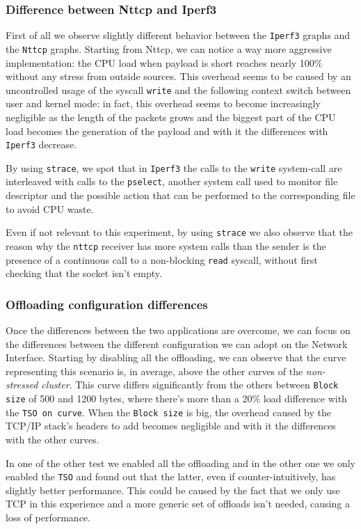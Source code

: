 \documentclass{exam}
\begin{document}
\subsubsection{Difference between Nttcp and Iperf3}
First of all we observe slightly different behavior between the \verb|Iperf3| graphs and the \verb|Nttcp| graphs. 
Starting from Nttcp, we can notice a way more aggressive implementation: the CPU load when payload is short reaches nearly 100\% without any stress from outside sources. This overhead seems to be caused by an uncontrolled usage of the syscall \verb|write| and the following context switch between user and kernel mode: in fact, this overhead seems to become increasingly negligible as the length of the packets grows and the biggest part of the CPU load becomes the generation of the payload and with it the differences with \verb|Iperf3| decrease.

By using \verb|strace|, we spot that in \verb|Iperf3| the calls to the \verb|write| system-call are interleaved with calls to the \verb|pselect|, another system call used to monitor file descriptor and the possible action that can be performed to the corresponding file to avoid CPU waste. 

Even if not relevant to this experiment, by using \verb|strace| we also observe that the reason why the \verb|nttcp| receiver has more system calls than the sender is the presence of a continuous call to a non-blocking \verb|read| syscall, without first checking that the socket isn't empty.

\subsubsection{Offloading configuration differences}
Once the differences between the two applications are overcome, we can focus on the differences between the different configuration we can adopt on the Network Interface.
Starting by disabling all the offloading, we can observe that the curve representing this scenario is, in average, above the other curves of the \textit{non-stressed cluster}. This curve differs significantly from the others between \verb|Block size| of 500 and 1200 bytes, where there's more than a 20\% load difference with the \verb|TSO on curve|. When the \verb|Block size| is big, the overhead caused by the TCP/IP stack's headers to add becomes negligible and with it the differences with the other curves.

In one of the other test we enabled all the offloading and in the other one we  only enabled the \verb|TSO| and found out that the latter, even if counter-intuitively, has slightly better performance. This could be caused by the fact that we only use TCP in this experience and a more generic set of offloads isn't needed, causing a loss of performance. 
\end{document}
